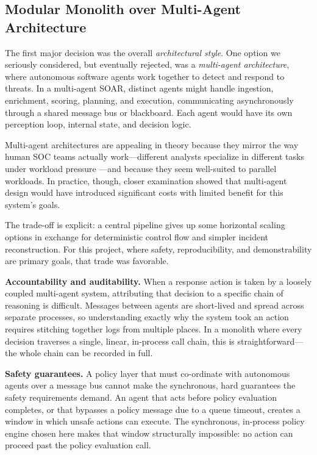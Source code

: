 \subsection{Modular Monolith over Multi-Agent Architecture}

The first major decision was the overall \textit{architectural style}. One option we
seriously considered, but eventually rejected, was a \textit{multi-agent architecture},
where autonomous software agents work together to detect and respond to threats. In a
multi-agent SOAR, distinct agents might handle
ingestion, enrichment, scoring, planning, and execution, communicating asynchronously
through a shared message bus or blackboard. Each agent would have its own perception
loop, internal state, and decision logic.

Multi-agent architectures are appealing in theory because they mirror the way human
SOC teams actually work---different analysts specialize in different tasks under
workload pressure \cite{tilbury2024humans}---and because they seem well-suited to
parallel workloads. In practice, though, closer examination showed that multi-agent design
would have introduced significant costs with limited benefit for this system's goals.

The trade-off is explicit: a central pipeline gives up some horizontal scaling options
in exchange for deterministic control flow and simpler incident reconstruction. For this
project, where safety, reproducibility, and demonstrability are primary goals, that
trade was favorable.

\textbf{Accountability and auditability.} When a response action is taken by a loosely
coupled multi-agent system, attributing that decision to a specific chain of reasoning
is difficult. Messages between agents are short-lived and spread across separate
processes, so understanding exactly why the system took an action requires
stitching together logs from multiple places. In a monolith where every decision
traverses a single, linear, in-process call chain, this is straightforward---the whole
chain can be recorded in full.

\textbf{Safety guarantees.} A policy layer that must co-ordinate with autonomous agents
over a message bus cannot make the synchronous, hard guarantees the safety requirements
demand. An agent that acts before policy evaluation completes, or that bypasses
a policy message due to a queue timeout, creates a window in which unsafe actions can
execute. The synchronous, in-process policy engine chosen here makes that window
structurally impossible: no action can proceed past the policy evaluation call.

